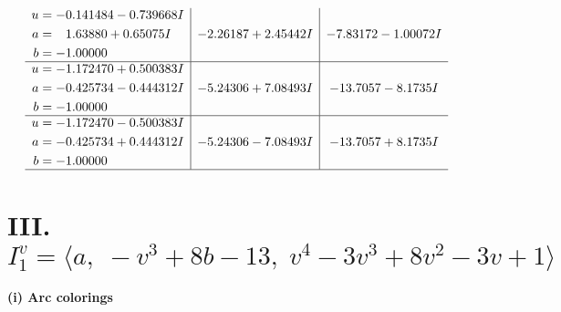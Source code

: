 \documentclass[1p]{elsarticle_modified}
\theoremstyle{definition}
\begin{document}
$$\begin{array}{c|c|c}
\begin{aligned}
u &= -0.141484 - 0.739668 I \\
a &= \phantom{-}1.63880 + 0.65075 I \\
b &= -1.00000\phantom{ +0.000000I}\end{aligned}
 & -2.26187 + 2.45442 I & -7.83172 - 1.00072 I \\ \hline\begin{aligned}
u &= -1.172470 + 0.500383 I \\
a &= -0.425734 - 0.444312 I \\
b &= -1.00000\phantom{ +0.000000I}\end{aligned}
 & -5.24306 + 7.08493 I & -13.7057 - 8.1735 I \\ \hline\begin{aligned}
u &= -1.172470 - 0.500383 I \\
a &= -0.425734 + 0.444312 I \\
b &= -1.00000\phantom{ +0.000000I}\end{aligned}
 & -5.24306 - 7.08493 I & -13.7057 + 8.1735 I\\
 \hline 
 \end{array}$$\newpage\newpage\renewcommand{\arraystretch}{1}
\centering \section*{III. $I^v_{1}= \langle a,\;- v^3+8 b-13,\;v^4-3 v^3+8 v^2-3 v+1 \rangle$}
\flushleft \textbf{(i) Arc colorings}\\
\end{document}
